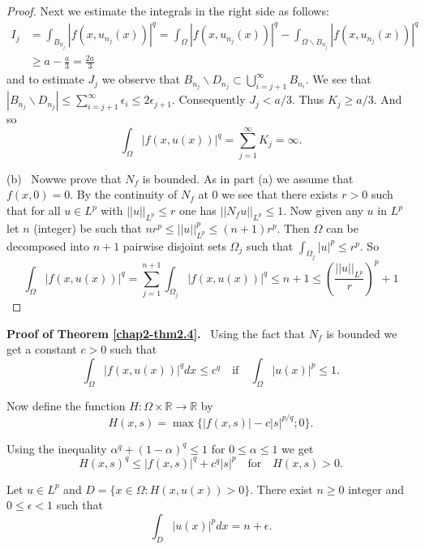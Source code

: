 \begin{proof}
Next we estimate the integrals in the right side as follows:
\begin{align*}
I_{j} &=
\int_{B_{n_{j}}}|f(x,u_{n_{j}}(x))|^{q}=\int_{\Omega}|f(x,u_{n_{j}}(x))|^{q}-\int_{\Omega\backslash
  B_{n_{j}}}|f(x,u_{n_{j}}(x))|^{q}\\
&\geq a-\frac{a}{3}=\frac{2a}{3}
\end{align*}
and to estimate $J_{j}$ we observe that $B_{n_{j}}\backslash
D_{n_{j}}\subset \bigcup\limits^{\infty}_{i=j+1}B_{n_{i}}$. We see that
$|B_{n_{j}}\backslash D_{n_{j}}|\leq
\sum\limits^{\infty}_{i=j+1}\epsilon_{i}\leq 2\epsilon_{j+1}$. Consequently
$J_{j}<a/3$. Thus $K_{j}\geq a/3$. And so
$$
\int_{\Omega}|f(x,u(x))|^{q}=\sum\limits^{\infty}_{j=1}K_{j}=\infty. 
$$

(b)~ Now\pageoriginale we prove that $N_{f}$ is bounded. As in part
(a) we assume that $f(x,0)=0$. By the continuity of $N_{f}$ at $0$ we
see that there exists $r>0$ such that for all $u\in L^{p}$ with
$||u||_{L^{p}}\leq r$ one has $||N_{f}u||_{L^{p}}\leq 1$. Now given
any $u$ in $L^{p}$ let $n$ (integer) be such that $nr^{p}\leq
||u||^{p}_{L^{p}}\leq (n+1)r^{p}$. Then $\Omega$ can be decomposed
into $n+1$ pairwise disjoint sets $\Omega_{j}$ such that
$\int_{\Omega_{j}}|u|^{p}\leq r^{p}$. So
$$
\int_{\Omega}|f(x,u(x))|^{q}=\sum\limits^{n+1}_{j=1}\int_{\Omega_{j}}|f(x,u(x))|^{q}\leq
n+1\leq \left(\frac{||u||_{L^{p}}}{r}\right)^{p}+1
$$
\end{proof}

\noindent
{\bf Proof of Theorem \ref{chap2-thm2.4}.}~ Using the fact that
$N_{f}$ is bounded we get a constant $c>0$ such that
\begin{equation*}
\int_{\Omega}|f(x,u(x))|^{q}dx\leq c^{q}\quad\text{if}\quad
\int_{\Omega}|u(x)|^{p}\leq 1.\tag{2.5}\label{chap2-eq2.5}
\end{equation*}

Now define the function $H:\Omega\times \mathbb{R}\to \mathbb{R}$ by
$$
H(x,s)=\max\{|f(x,s)|-c|s|^{p/q};0\}.
$$

Using the inequality $\alpha^{q}+(1-\alpha)^{q}\leq 1$ for $0\leq
\alpha\leq 1$ we get
\begin{equation*}
H(x,s)^{q}\leq |f(x,s)|^{q}+c^{q}|s|^{p}\quad\text{for}\quad
H(x,s)>0.\tag{2.6}\label{chap2-eq2.6}
\end{equation*}

Let $u\in L^{p}$ and $D=\{x\in \Omega:H(x,u(x))>0\}$. There exist
$n\geq 0$ integer and $0\leq \epsilon<1$ such that
$$
\int_{D}|u(x)|^{p}dx=n+\epsilon.
$$


